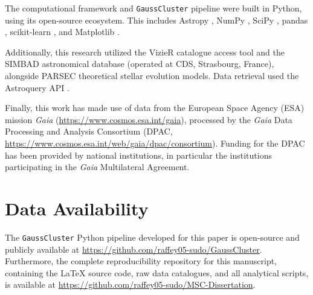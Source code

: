 \documentclass{CU_IOPStyle_PXT999}
\begin{document}
The computational framework and \texttt{GaussCluster} pipeline were built in Python, using its open-source ecosystem. This includes Astropy \cite{astropy_2013}, NumPy \cite{Harris_2020}, SciPy \cite{scipy}, pandas \cite{pandas_2020}, scikit-learn \cite{scikit-learn}, and Matplotlib \cite{matplotlib}. 

Additionally, this research utilized the VizieR catalogue access tool and the SIMBAD astronomical database (operated at CDS, Strasbourg, France), alongside PARSEC theoretical stellar evolution models. Data retrieval used the Astroquery API \cite{ginsburg_astroquery_2019}.

Finally, this work has made use of data from the European Space Agency (ESA) mission \textit{Gaia} (\url{https://www.cosmos.esa.int/gaia}), processed by the \textit{Gaia} Data Processing and Analysis Consortium (DPAC, \url{https://www.cosmos.esa.int/web/gaia/dpac/consortium}). Funding for the DPAC has been provided by national institutions, in particular the institutions participating in the \textit{Gaia} Multilateral Agreement.

\section*{Data Availability}
The \texttt{GaussCluster} Python pipeline developed for this paper is open-source and publicly available at \url{https://github.com/raffey05-sudo/GaussCluster}. Furthermore, the complete reproducibility repository for this manuscript, containing the LaTeX source code, raw data catalogues, and all analytical scripts, is available at \url{https://github.com/raffey05-sudo/MSC-Dissertation}.


\clearpage
 
\newpage
\onecolumn

\end{document}
